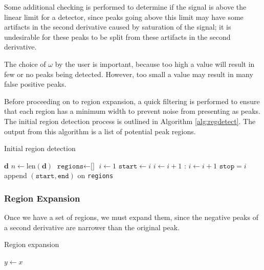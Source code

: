 \documentclass{article}
\begin{document}
Some additional checking is performed to determine if the signal is above the linear limit for a detector, since peaks going above this limit may have some artifacts in the second derivative caused by saturation of the signal; it is undesirable for these peaks to be split from these artifacts in the second derivative.

The choice of $\omega$ by the user is important, because too high a value will result in few or no peaks being detected. However, too small a value may result in many false positive peaks.

Before proceeding on to region expansion, a quick filtering is performed to ensure that each region has a minimum width to prevent noise from presenting as peaks. The initial region detection process is outlined in Algorithm \ref{alg:regdetect}. The output from this algorithm is a list of potential peak regions.

\begin{algorithm}[t]
\caption{Initial region detection}\label{alg:regdetect}
\begin{algorithmic}
\Require $\mathbf{d}$ 
\State $n \gets \text{len}(\mathbf{d})$
\State $\texttt{regions} \gets \texttt{[]}$
\State $i \gets 1$
    \State $\texttt{start} \gets i$
    \State $i \gets i+1$
    :
      \State $i \gets i+1$
    \EndWhile
    \State $\texttt{stop} = i$
  	  \State append $(\texttt{start}, \texttt{end})$ on \texttt{regions}
    \EndIf
  \EndIf
\EndWhile
\end{algorithmic}
\end{algorithm}



\subsubsection{Region Expansion}

Once we have a set of regions, we must expand them, since the negative peaks of a second derivative are narrower than the original peak.



\begin{algorithm}[t]
\caption{Region expansion}\label{alg:regexp}
\begin{algorithmic}
\State $y \gets x$
\end{algorithmic}
\end{algorithm}
\end{document}
